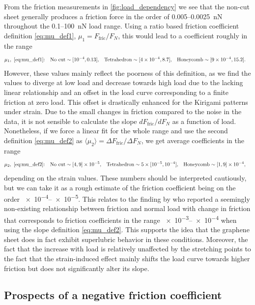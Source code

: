 From the friction measurements in \cref{fig:load_dependency} we see that the
non-cut sheet generally produces a friction force in the order of 0.005--\SI{0.0025}{nN} throughout the 0.1--\SI{100}{nN} load range. Using a ratio based friction coefficient definition \cref{eq:mu_def1}, $\mu_1 = F_{\text{fric}}/{F_N}$, this would lead to a coefficient roughly in the range
\begin{align*}
  &\mu_1,  \ \text{\cref{eq:mu_def1}:}& &\text{No cut}\sim [\num{e-4}, 0.13],&  &\text{Tetrahedron}\sim [\num{4e-4},8.7],& &\text{Honeycomb}\sim [\num{9e-4}, 15.2].&
\end{align*}
However, these values mainly reflect the poorness of this definition, as we find the values to diverge at low load and decrease towards high load due to the lacking linear relationship and an offset in the load curve corresponding to a finite friction at zero load. This offset is drastically enhanced for the Kirigami patterns under strain. Due to the small changes in friction compared to the noise in the data, it is not sensible to calculate the slope $dF_{\text{fric}}/dF_N$ as a function of load. Nonetheless, if we force a linear fit for the whole range and use the second definition \cref{eq:mu_def2} as $\langle \mu_2 \rangle = \Delta F_{\text{fric}}/\Delta F_N$, we get average coefficients in the range
\begin{align*}
  &\mu_2,  \ \text{\cref{eq:mu_def2}:}& &\text{No cut} \sim [4, 9]\times \num{e-5},&  &\text{Tetrahedron} \sim 5\times[\num{e-5}, \num{e-4}],& &\text{Honeycomb} \sim [1,9]\times \num{e-4},&
\end{align*}
depending on the strain values. These numbers should be interpreted cautiously,
but we can take it as a rough estimate of the friction coefficient being on
the order \num{e-4}--\num{e-5}. This relates to the finding by
\cite{DIENWIEBEL2005197} who reported a seemingly non-existing relationship
between friction and normal load with change in friction that corresponds to friction coefficients in the range \num{e-3}--\num{e-4} when using the slope definition \cref{eq:mu_def2}. This supports the idea that the graphene sheet does in fact exhibit superlubric behavior in these conditions. Moreover, the fact that the increase with load is relatively unaffected by the stretching points to the fact that the strain-induced effect mainly shifts the load curve towards higher friction but does not significantly alter its slope. 


\subsection{Prospects of a negative friction coefficient}\label{sec:neg_prospects}

